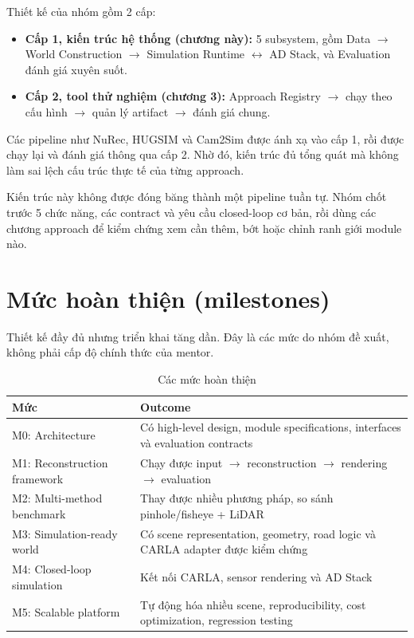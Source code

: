 Thiết kế của nhóm gồm 2 cấp:
\begin{itemize}
  \item \textbf{Cấp 1, kiến trúc hệ thống (chương này):} 5 subsystem, gồm Data $\to$ World Construction $\to$ Simulation Runtime $\leftrightarrow$ AD Stack, và Evaluation đánh giá xuyên suốt.
  \item \textbf{Cấp 2, tool thử nghiệm (chương 3):} Approach Registry $\to$ chạy theo cấu hình $\to$ quản lý artifact $\to$ đánh giá chung.
\end{itemize}

Các pipeline như NuRec, HUGSIM và Cam2Sim được ánh xạ vào cấp 1, rồi được chạy lại và đánh giá thông qua cấp 2.
Nhờ đó, kiến trúc đủ tổng quát mà không làm sai lệch cấu trúc thực tế của từng approach.

Kiến trúc này không được đóng băng thành một pipeline tuần tự.
Nhóm chốt trước 5 chức năng, các contract và yêu cầu closed-loop cơ bản, rồi dùng các chương approach để kiểm chứng xem cần thêm, bớt hoặc chỉnh ranh giới module nào.

\section{Mức hoàn thiện (milestones)}

Thiết kế đầy đủ nhưng triển khai tăng dần.
Đây là các mức do nhóm đề xuất, không phải cấp độ chính thức của mentor.

\begin{table}[H]
  \centering
  \caption{Các mức hoàn thiện}
  \begin{tabularx}{\linewidth}{>{\raggedright\arraybackslash}p{5cm} X}
    \toprule
    \textbf{Mức} & \textbf{Outcome} \\
    \midrule
    M0: Architecture & Có high-level design, module specifications, interfaces và evaluation contracts \\
    \addlinespace
    M1: Reconstruction framework & Chạy được input $\to$ reconstruction $\to$ rendering $\to$ evaluation \\
    \addlinespace
    M2: Multi-method benchmark & Thay được nhiều phương pháp, so sánh pinhole/fisheye + LiDAR \\
    \addlinespace
    M3: Simulation-ready world & Có scene representation, geometry, road logic và CARLA adapter được kiểm chứng \\
    \addlinespace
    M4: Closed-loop simulation & Kết nối CARLA, sensor rendering và AD Stack \\
    \addlinespace
    M5: Scalable platform & Tự động hóa nhiều scene, reproducibility, cost optimization, regression testing \\
    \bottomrule
  \end{tabularx}
\end{table}

